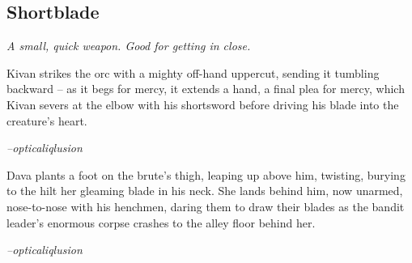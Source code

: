 \subsection{Shortblade}
\textit{A small, quick weapon. Good for getting in close.}

\begin{quotebox}
  Kivan strikes the orc with a mighty off-hand uppercut, sending it tumbling backward -- as it begs for mercy, it extends a hand, a final plea
  for mercy, which Kivan severs at the elbow with his shortsword before driving his blade into the creature's heart.

  \textit{--opticaliqlusion}
\end{quotebox}

\begin{quotebox}
  Dava plants a foot on the brute's thigh, leaping up above him, twisting, burying to the hilt her gleaming blade in his neck. She lands behind him, now unarmed, nose-to-nose with his henchmen, daring them to draw their blades as the bandit leader's enormous corpse crashes to the alley floor behind her.

  \textit{--opticaliqlusion}
\end{quotebox}
